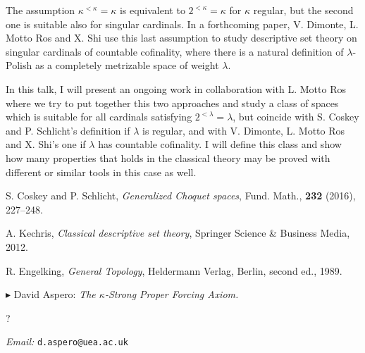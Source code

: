 \documentclass[a4paper]{amsart}
\theoremstyle{remark}
\newcommand{\vsp}{\vspace{20pt}}
\begin{document}
The assumption $\kappa^{<\kappa}=\kappa$ is equivalent to $2^{<\kappa}=\kappa$ for $\kappa$ regular, but the second one is suitable also for singular cardinals. 
In a forthcoming paper, V. Dimonte, L. Motto Ros and X. Shi use this last assumption to study descriptive set theory on singular cardinals of countable cofinality, where there is a natural definition of $\lambda$-Polish as a completely metrizable space of weight $\lambda$. 

In this talk, I will present an ongoing work in collaboration with L. Motto Ros where we try to put together this two approaches and study a class of spaces which is suitable for all cardinals satisfying $2^{<\lambda}=\lambda$, but coincide with S. Coskey and P. Schlicht's definition if $\lambda$ is regular, and with V. Dimonte, L. Motto Ros and X. Shi's one if $\lambda$ has countable cofinality. I will define this class and show how many properties that holds in the classical theory may be proved with different or similar tools in this case as well.  

\smallskip 
\renewcommand{\section}[2]{}

\begin{thebibliography}{100}

 S. Coskey and P. Schlicht, \emph{Generalized Choquet spaces}, Fund. Math., \textbf{232} (2016), 227--248.

 A. Kechris, \emph{Classical descriptive set theory}, Springer Science \& Business Media, 2012.
 
 R. Engelking, \emph{General Topology}, Heldermann Verlag, Berlin, second ed., 1989.
 
\end{thebibliography}









\vsp

\noindent 
$\blacktriangleright$ David Aspero: \emph{The $\kappa$-Strong Proper Forcing Axiom.} 

\noindent 
? 

\noindent 
\emph{Email:} \texttt{d.aspero@uea.ac.uk}
\end{document}
